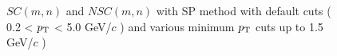 	\begin{figure}[htbp]
            \begin{center}
              \end{center}
              \caption{$SC(m,n)$ and $NSC(m,n)$ with SP method with default cuts ( 0.2 < $p_{\rm{T}}$ < 5.0 GeV/$c$ ) and various minimum $p_{\rm{T}}$ cuts up to 1.5 GeV/$c$ )}
              \label{fig:SC_pt_withSP_higher}
       \end{figure}



